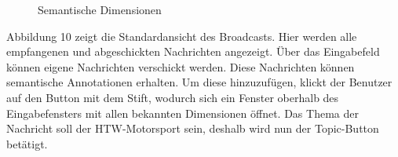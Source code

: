 \begin{minipage}{0.47\linewidth}
	\begin{figure}[H]
		\centering
		\caption{Semantische Dimensionen}
		\label{fig:hello2}
	\end{figure}
\end{minipage}
\newpage
Abbildung 10 zeigt die Standardansicht des Broadcasts. Hier werden alle empfangenen und abgeschickten Nachrichten angezeigt. Über das Eingabefeld können eigene Nachrichten verschickt werden. Diese Nachrichten können semantische Annotationen erhalten. Um diese hinzuzufügen, klickt der Benutzer auf den Button mit dem Stift, wodurch sich ein Fenster oberhalb des Eingabefensters mit allen bekannten Dimensionen öffnet. Das Thema der Nachricht soll der HTW-Motorsport sein, deshalb wird nun der Topic-Button betätigt. \newline\newline
